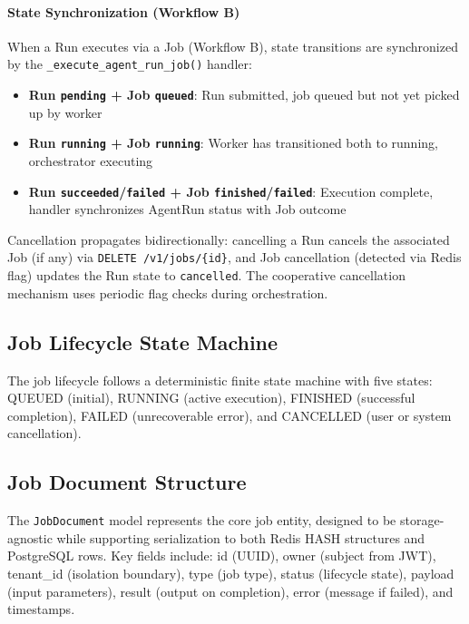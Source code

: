 \documentclass[a4paper,twoside]{sapthesis}
\begin{document}
\paragraph{State Synchronization (Workflow B)}

When a Run executes via a Job (Workflow B), state transitions are synchronized by the \texttt{\_execute\_agent\_run\_job()} handler:

\begin{itemize}
    \item \textbf{Run \texttt{pending} + Job \texttt{queued}}: Run submitted, job queued but not yet picked up by worker
    \item \textbf{Run \texttt{running} + Job \texttt{running}}: Worker has transitioned both to running, orchestrator executing
    \item \textbf{Run \texttt{succeeded}/\texttt{failed} + Job \texttt{finished}/\texttt{failed}}: Execution complete, handler synchronizes AgentRun status with Job outcome
\end{itemize}

Cancellation propagates bidirectionally: cancelling a Run cancels the associated Job (if any) via \texttt{DELETE /v1/jobs/\{id\}}, and Job cancellation (detected via Redis flag) updates the Run state to \texttt{cancelled}. The cooperative cancellation mechanism uses periodic flag checks during orchestration.

\subsection{Job Lifecycle State Machine}

The job lifecycle follows a deterministic finite state machine with five states: QUEUED (initial), RUNNING (active execution), FINISHED (successful completion), FAILED (unrecoverable error), and CANCELLED (user or system cancellation).

\subsection{Job Document Structure}
\label{subsec:job-document-structure}

The \texttt{JobDocument} model represents the core job entity, designed to be storage-agnostic while supporting serialization to both Redis HASH structures and PostgreSQL rows. Key fields include: id (UUID), owner (subject from JWT), tenant\_id (isolation boundary), type (job type), status (lifecycle state), payload (input parameters), result (output on completion), error (message if failed), and timestamps.
\end{document}
